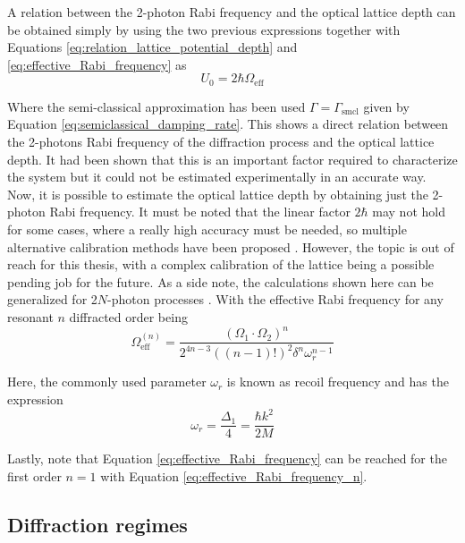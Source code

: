 A relation between the 2-photon Rabi frequency and the optical lattice depth can be obtained simply by using the two previous expressions together with Equations \eqref{eq:relation_lattice_potential_depth} and \eqref{eq:effective_Rabi_frequency} as \cite{Ovchinnikov1999}
\begin{equation}\label{eq:relation_rabi_frequency_lattice_depth}
	U_0 = 2\hbar\Omega_\text{eff}
\end{equation}

Where the semi-classical approximation has been used $\Gamma=\Gamma_\text{smcl}$ given by Equation \eqref{eq:semiclassical_damping_rate}. This shows a direct relation between the 2-photons Rabi frequency of the diffraction process and the optical lattice depth. It had been shown that this is an important factor required to characterize the system but it could not be estimated experimentally in an accurate way. Now, it is possible to estimate the optical lattice depth by obtaining just the 2-photon Rabi frequency. It must be noted that the linear factor $2\hbar$ may not hold for some cases, where a really high accuracy must be needed, so multiple alternative calibration methods have been proposed \cite{Ovchinnikov1999,Cabrera2018, Friebel1998,Cristiani2002}. However, the topic is out of reach for this thesis, with a complex calibration of the lattice being a possible pending job for the future. As a side note, the calculations shown here can be generalized for 2$N$-photon processes \cite{Giltner1995}. With the effective Rabi frequency for any resonant $n$ diffracted order being
\begin{equation}\label{eq:effective_Rabi_frequency_n}
	\Omega_\text{eff}^{(n)} = \frac{(\Omega_1 \cdot \Omega_2)^n}{2^{4n-3}((n-1)!)^2\delta^n\omega_r^{n-1}}
\end{equation}

Here, the commonly used  parameter $\omega_r$ is known as recoil frequency and has the expression
\begin{equation}
	\omega_r = \frac{\Delta_1}{4} = \frac{\hbar k^2}{2M}
\end{equation}

Lastly, note that Equation \eqref{eq:effective_Rabi_frequency} can be reached for the first order $n=1$ with Equation \eqref{eq:effective_Rabi_frequency_n}. 

\subsection{Diffraction regimes}\label{subsec:diffraction_regimes}


